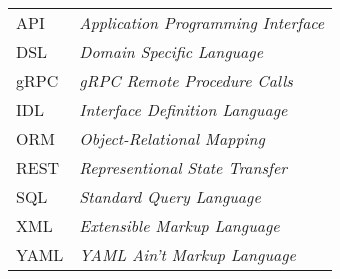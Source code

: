 \begin{longtable}{ll}
  API & \textit{Application Programming Interface} \\
  DSL & \textit{Domain Specific Language} \\
  gRPC & \textit{gRPC Remote Procedure Calls} \\
  IDL & \textit{Interface Definition Language} \\
  ORM & \textit{Object-Relational Mapping} \\
  REST & \textit{Representional State Transfer} \\
  SQL & \textit{Standard Query Language} \\
  XML & \textit{Extensible Markup Language} \\
  YAML & \textit{YAML Ain't Markup Language} \\
\end{longtable}

